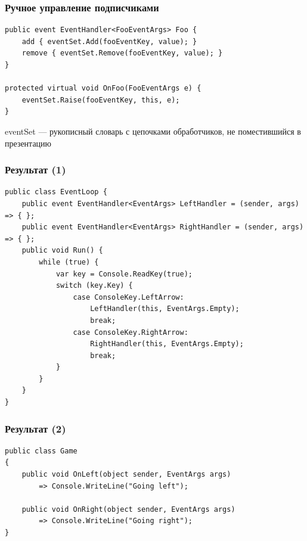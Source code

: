 \documentclass{../../slides-style}
\begin{document}
    \begin{frame}[fragile]
        \frametitle{Ручное управление подписчиками}
        \begin{verbatim}
public event EventHandler<FooEventArgs> Foo {
    add { eventSet.Add(fooEventKey, value); }
    remove { eventSet.Remove(fooEventKey, value); }
}

protected virtual void OnFoo(FooEventArgs e) {
    eventSet.Raise(fooEventKey, this, e);
}
        \end{verbatim}
        \vspace{7mm}
        eventSet --- рукописный словарь с цепочками обработчиков, не поместившийся в презентацию
    \end{frame}

    \begin{frame}[fragile]
        \frametitle{Результат (1)}
        \begin{footnotesize}
            \begin{verbatim}
public class EventLoop {
    public event EventHandler<EventArgs> LeftHandler = (sender, args) => { };
    public event EventHandler<EventArgs> RightHandler = (sender, args) => { };
    public void Run() {
        while (true) {
            var key = Console.ReadKey(true);
            switch (key.Key) {
                case ConsoleKey.LeftArrow:
                    LeftHandler(this, EventArgs.Empty);
                    break;
                case ConsoleKey.RightArrow:
                    RightHandler(this, EventArgs.Empty);
                    break;
            }
        }
    }
}
            \end{verbatim}
        \end{footnotesize}
    \end{frame}

    \begin{frame}[fragile]
        \frametitle{Результат (2)}
        \begin{footnotesize}
            \begin{verbatim}
public class Game
{
    public void OnLeft(object sender, EventArgs args)
        => Console.WriteLine("Going left");

    public void OnRight(object sender, EventArgs args)
        => Console.WriteLine("Going right");
}
            \end{verbatim}
        \end{footnotesize}
    \end{frame}
\end{document}
